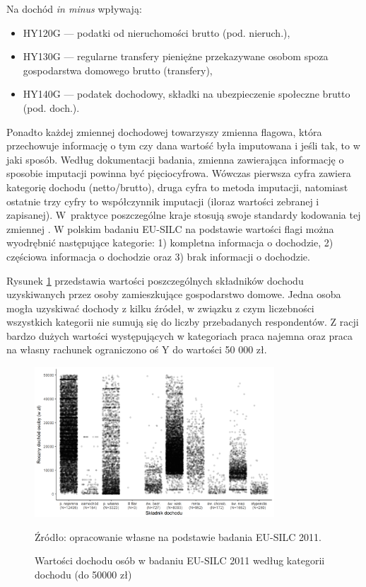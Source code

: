 Na dochód \emph{in minus} wpływają:

\begin{itemize}
\item HY120G --- podatki od nieruchomości brutto (pod. nieruch.),
\item HY130G --- regularne transfery pieniężne przekazywane osobom spoza gospodarstwa domowego brutto (transfery),
\item HY140G --- podatek dochodowy, składki na ubezpieczenie społeczne brutto (pod. doch.).
\end{itemize}

Ponadto każdej zmiennej dochodowej towarzyszy zmienna flagowa, która przechowuje informację o tym czy dana wartość była imputowana i jeśli tak, to w jaki sposób. Według dokumentacji badania, zmienna zawierająca informację o sposobie imputacji powinna być pięciocyfrowa. Wówczas pierwsza cyfra zawiera kategorię dochodu (netto/brutto), druga cyfra to metoda imputacji, natomiast ostatnie trzy cyfry to współczynnik imputacji (iloraz wartości zebranej i zapisanej). W~praktyce poszczególne kraje stosują swoje standardy kodowania tej zmiennej \citep{brandolini2010}. W polskim badaniu EU-SILC na podstawie wartości flagi można wyodrębnić następujące kategorie: 1) kompletna informacja o dochodzie, 2) częściowa informacja o dochodzie oraz 3) brak informacji o dochodzie.

Rysunek \ref{fig:dochod_osoby} przedstawia wartości poszczególnych składników dochodu uzyskiwanych przez osoby zamieszkujące gospodarstwo domowe. Jedna osoba mogła uzyskiwać dochody z kilku źródeł, w związku z czym liczebności wszystkich kategorii nie sumują się do liczby przebadanych respondentów. Z racji bardzo dużych wartości występujących w kategoriach praca najemna oraz praca na własny rachunek ograniczono oś Y do wartości 50 000 zł. 

\begin{figure}[ht]
\centering
\includegraphics[width=0.8\textwidth]{04_wykresy/dochod_osoby-1.png}
\caption{Wartości dochodu osób w badaniu EU-SILC 2011 według kategorii dochodu (do 50000 zł)}
\small{Źródło: opracowanie własne na podstawie badania EU-SILC 2011.}
\label{fig:dochod_osoby}
\end{figure}


